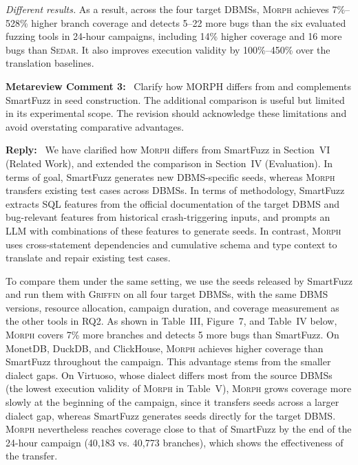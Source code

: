 \documentclass[12pt,letterpaper]{article}
\newcommand{\morph}{\textsc{Morph}}
\newcommand{\sedar}{\textsc{Sedar}}
\newcommand{\griffin}{\textsc{Griffin}}
\newcommand{\tool}{\morph}
\newcommand{\reviewstart}{\par\addvspace{0.85\baselineskip}\Needspace{4\baselineskip}\noindent}
\newcounter{metareviewanchor}
\newcommand{\metareviewcomment}[1]{\reviewstart\renewcommand{\themetareviewanchor}{#1}\refstepcounter{metareviewanchor}\label{metareview:#1}\textbf{Metareview Comment #1:}\ }
\newcommand{\reply}{\par\nobreak\noindent\textbf{Reply:}\ }
\begin{document}
\textit{Different results.} As a result, across the four target DBMSs, \tool{} achieves 7\%--528\% higher branch coverage and detects 5--22 more bugs than the six evaluated fuzzing tools in 24-hour campaigns, including 14\% higher coverage and 16 more bugs than \sedar{}. It also improves execution validity by 100\%--450\% over the translation baselines.

\metareviewcomment{3} Clarify how MORPH differs from and complements SmartFuzz in seed construction. The additional comparison is useful but limited in its experimental scope. The revision should acknowledge these limitations and avoid overstating comparative advantages.

\reply
We have clarified how \tool{} differs from SmartFuzz in Section~VI (Related Work), and extended the comparison in Section~IV (Evaluation). In terms of goal, SmartFuzz generates new DBMS-specific seeds, whereas \tool{} transfers existing test cases across DBMSs. In terms of methodology, SmartFuzz extracts SQL features from the official documentation of the target DBMS and bug-relevant features from historical crash-triggering inputs, and prompts an LLM with combinations of these features to generate seeds. In contrast, \tool{} uses cross-statement dependencies and cumulative schema and type context to translate and repair existing test cases.

To compare them under the same setting, we use the seeds released by SmartFuzz and run them with \griffin{} on all four target DBMSs, with the same DBMS versions, resource allocation, campaign duration, and coverage measurement as the other tools in RQ2. As shown in Table~III, Figure~7, and Table~IV below, \tool{} covers 7\% more branches and detects 5 more bugs than SmartFuzz. On MonetDB, DuckDB, and ClickHouse, \tool{} achieves higher coverage than SmartFuzz throughout the campaign. This advantage stems from the smaller dialect gaps. On Virtuoso, whose dialect differs most from the source DBMSs (the lowest execution validity of \tool{} in Table~V), \tool{} grows coverage more slowly at the beginning of the campaign, since it transfers seeds across a larger dialect gap, whereas SmartFuzz generates seeds directly for the target DBMS. \tool{} nevertheless reaches coverage close to that of SmartFuzz by the end of the 24-hour campaign (40,183 vs. 40,773 branches), which shows the effectiveness of the transfer.
\end{document}
